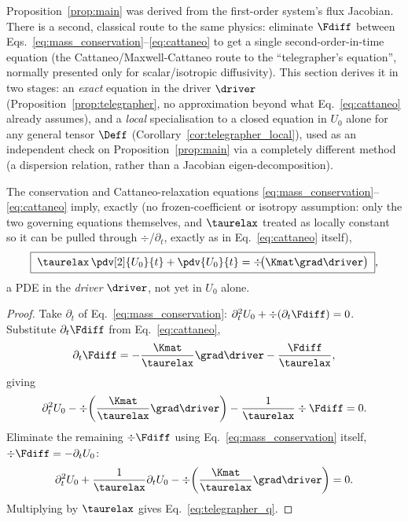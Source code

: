Proposition~\ref{prop:main} was derived from the first-order system's
flux Jacobian. There is a second, classical route to the same physics:
eliminate $\Fdiff$ between Eqs.~\eqref{eq:mass_conservation}--\eqref{eq:cattaneo}
to get a single second-order-in-time equation (the Cattaneo/Maxwell-Cattaneo
route to the ``telegrapher's equation'', normally presented only for
scalar/isotropic diffusivity). This section derives it in two stages: an
\emph{exact} equation in the driver $\driver$ (Proposition~\ref{prop:telegrapher},
no approximation beyond what Eq.~\eqref{eq:cattaneo} already assumes), and
a \emph{local} specialisation to a closed equation in $U_0$ alone for any
general tensor $\Deff$ (Corollary~\ref{cor:telegrapher_local}), used as an
independent check on Proposition~\ref{prop:main} via a completely
different method (a dispersion relation, rather than a Jacobian
eigen-decomposition).

\begin{proposition}
\label{prop:telegrapher}
The conservation and Cattaneo-relaxation equations
\eqref{eq:mass_conservation}--\eqref{eq:cattaneo} imply, exactly (no
frozen-coefficient or isotropy assumption: only the two governing
equations themselves, and $\taurelax$ treated as locally constant so it
can be pulled through $\div$/$\partial_t$, exactly as in
Eq.~\eqref{eq:cattaneo} itself),
\begin{equation}
  \label{eq:telegrapher_q}
  \boxed{\;\taurelax\,\pdv[2]{U_0}{t} + \pdv{U_0}{t} = \div\!\big(\Kmat\grad \driver\big)\;} ,
\end{equation}
a PDE in the \emph{driver} $\driver$, not yet in $U_0$ alone.
\end{proposition}

\begin{proof}
Take $\partial_t$ of Eq.~\eqref{eq:mass_conservation}:
$\partial_t^2 U_0 + \div(\partial_t\Fdiff)=0$. Substitute
$\partial_t\Fdiff$ from Eq.~\eqref{eq:cattaneo},
\begin{equation}
  \partial_t\Fdiff = -\frac{\Kmat}{\taurelax}\grad \driver - \frac{\Fdiff}{\taurelax} ,
\end{equation}
giving
\begin{equation}
  \partial_t^2U_0 - \div\!\left(\frac{\Kmat}{\taurelax}\grad \driver\right) - \frac{1}{\taurelax}\div\Fdiff = 0 .
\end{equation}
Eliminate the remaining $\div\Fdiff$ using
Eq.~\eqref{eq:mass_conservation} itself, $\div\Fdiff=-\partial_tU_0$:
\begin{equation}
  \partial_t^2U_0 + \frac{1}{\taurelax}\partial_tU_0 - \div\!\left(\frac{\Kmat}{\taurelax}\grad \driver\right) = 0 .
\end{equation}
Multiplying by $\taurelax$ gives Eq.~\eqref{eq:telegrapher_q}.
\end{proof}

